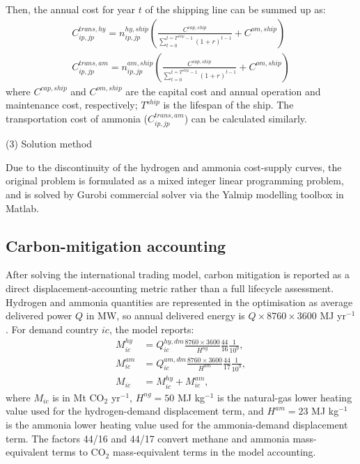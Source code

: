 \documentclass[sn-mathphys,Numbered]{sn-jnl}%
\theoremstyle{thmstyleone}%
\theoremstyle{thmstyletwo}%
\theoremstyle{thmstylethree}%
\begin{document}
Then, the annual cost for year $t$ of the shipping line can be summed up as:
\begin{align}
    C_{ip,jp}^{trans,hy} =  n_{ip,jp}^{hy,ship} \left( \frac{C^{cap,ship}}{\sum_{t = 0}^{t = T^{ship}-1} (1+r)^{t-1}} + C^{om,ship} \right)
    \\
    C_{ip,jp}^{trans,am} =  n_{ip,jp}^{am,ship} \left( \frac{C^{cap,ship}}{\sum_{t = 0}^{t = T^{ship}-1} (1+r)^{t-1}} + C^{om,ship} \right)
\end{align}
where $C^{cap,ship}$ and $C^{om,ship}$ are the capital cost and annual operation and maintenance cost, respectively; $T^{ship}$ is the lifespan of the ship.
The transportation cost of ammonia ($C_{ip,jp}^{trans,am}$) can be calculated similarly.

(3) Solution method

Due to the discontinuity of the hydrogen and ammonia cost-supply curves, the original problem is formulated as a mixed integer linear programming problem, and is solved by Gurobi \cite{Gurobi} commercial solver via the Yalmip modelling toolbox in Matlab.

\subsection{Carbon-mitigation accounting}

After solving the international trading model, carbon mitigation is reported as a direct displacement-accounting metric rather than a full lifecycle assessment. Hydrogen and ammonia quantities are represented in the optimisation as average delivered power $Q$ in MW, so annual delivered energy is $Q \times 8760 \times 3600$ MJ yr$^{-1}$. For demand country $ic$, the model reports:
\begin{align}
    M_{ic}^{hy} &= Q_{ic}^{hy,dm} \frac{8760 \times 3600}{H^{ng}}\frac{44}{16}\frac{1}{10^9},\\
    M_{ic}^{am} &= Q_{ic}^{am,dm} \frac{8760 \times 3600}{H^{am}}\frac{44}{17}\frac{1}{10^9},\\
    M_{ic} &= M_{ic}^{hy} + M_{ic}^{am},
\end{align}
where $M_{ic}$ is in Mt CO$_2$ yr$^{-1}$, $H^{ng}=50$ MJ kg$^{-1}$ is the natural-gas lower heating value used for the hydrogen-demand displacement term, and $H^{am}=23$ MJ kg$^{-1}$ is the ammonia lower heating value used for the ammonia-demand displacement term. The factors 44/16 and 44/17 convert methane and ammonia mass-equivalent terms to CO$_2$ mass-equivalent terms in the model accounting.
\end{document}
